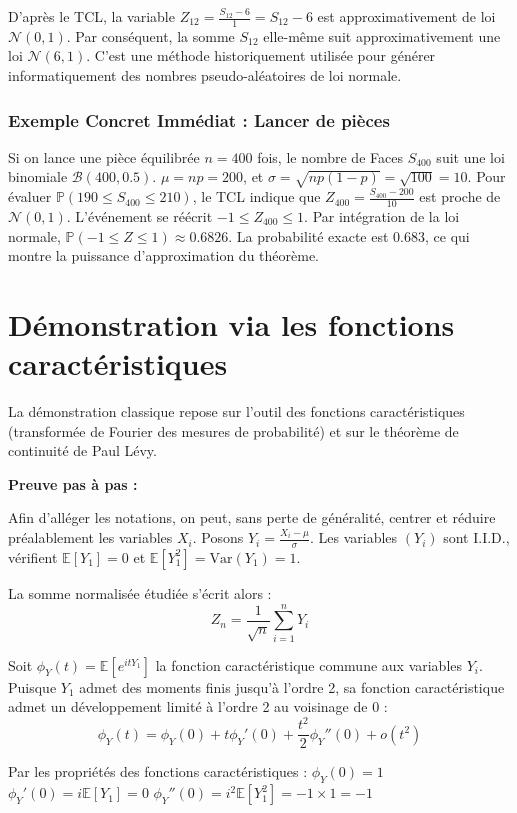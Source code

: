 \documentclass[11pt,a4paper]{article}
\begin{document}
D'après le TCL, la variable $Z_{12} = \frac{S_{12} - 6}{1} = S_{12} - 6$ est approximativement de loi $\mathcal{N}(0, 1)$.
Par conséquent, la somme $S_{12}$ elle-même suit approximativement une loi $\mathcal{N}(6, 1)$.
C'est une méthode historiquement utilisée pour générer informatiquement des nombres pseudo-aléatoires de loi normale.

\subsubsection{Exemple Concret Immédiat : Lancer de pièces}

Si on lance une pièce équilibrée $n=400$ fois, le nombre de Faces $S_{400}$ suit une loi binomiale $\mathcal{B}(400, 0.5)$.
$\mu = np = 200$, et $\sigma = \sqrt{np(1-p)} = \sqrt{100} = 10$.
Pour évaluer $\mathbb{P}(190 \le S_{400} \le 210)$, le TCL indique que $Z_{400} = \frac{S_{400} - 200}{10}$ est proche de $\mathcal{N}(0,1)$.
L'événement se réécrit $-1 \le Z_{400} \le 1$.
Par intégration de la loi normale, $\mathbb{P}(-1 \le Z \le 1) \approx 0.6826$.
La probabilité exacte est $0.683$, ce qui montre la puissance d'approximation du théorème.

\section{Démonstration via les fonctions caractéristiques}

La démonstration classique repose sur l'outil des fonctions caractéristiques (transformée de Fourier des mesures de probabilité) et sur le théorème de continuité de Paul Lévy.

\textbf{Preuve pas à pas :}

Afin d'alléger les notations, on peut, sans perte de généralité, centrer et réduire préalablement les variables $X_i$.
Posons $Y_i = \frac{X_i - \mu}{\sigma}$.
Les variables $(Y_i)$ sont I.I.D., vérifient $\mathbb{E}[Y_1] = 0$ et $\mathbb{E}[Y_1^2] = \text{Var}(Y_1) = 1$.

La somme normalisée étudiée s'écrit alors :
$$Z_n = \frac{1}{\sqrt{n}} \sum_{i=1}^n Y_i$$

Soit $\phi_Y(t) = \mathbb{E}[e^{itY_1}]$ la fonction caractéristique commune aux variables $Y_i$.
Puisque $Y_1$ admet des moments finis jusqu'à l'ordre 2, sa fonction caractéristique admet un développement limité à l'ordre 2 au voisinage de $0$ :
$$\phi_Y(t) = \phi_Y(0) + t \phi_Y'(0) + \frac{t^2}{2} \phi_Y''(0) + o(t^2)$$

Par les propriétés des fonctions caractéristiques :
\textbullet{} $\phi_Y(0) = 1$
\textbullet{} $\phi_Y'(0) = i\mathbb{E}[Y_1] = 0$
\textbullet{} $\phi_Y''(0) = i^2\mathbb{E}[Y_1^2] = -1 \times 1 = -1$
\end{document}
